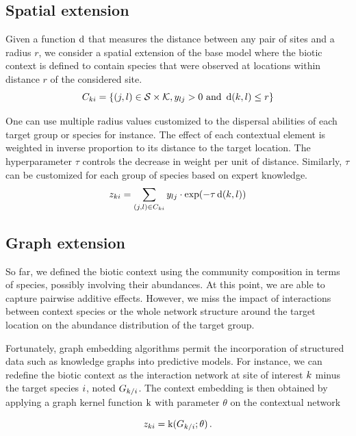 \documentclass[10pt,a4paper]{article}
\begin{document}
\subsection{Spatial extension}
Given a function $\operatorname{d}$ that measures the distance between any pair of sites and a radius $r$, we consider a spatial extension of the base model where the biotic context is defined to contain species that were observed at locations within distance $r$ of the considered site.
\begin{equation*}
  C_{ki} = \{(j, l) \in \mathcal{S} \times \mathcal{K}, y_{lj} > 0 \text{ and }  \operatorname{d}(k, l) \leq r\}
\end{equation*}

One can use multiple radius values customized to the dispersal abilities of each target group or species for instance. The effect of each contextual element is weighted in inverse proportion to its distance to the target location. The hyperparameter $\tau$ controls the decrease in weight per unit of distance. Similarly, $\tau$ can be customized for each group of species based on expert knowledge.  
\begin{equation*}
  z_{ki} = \sum_{(j, l) \in C_{ki}} y_{lj} \cdot \exp(-\tau \operatorname{d}(k, l))
\end{equation*}

\subsection{Graph extension}
So far, we defined the biotic context using the community composition in terms of species, possibly involving their abundances. At this point, we are able to capture pairwise additive effects. However, we miss the impact of interactions between context species or the whole network structure around the target location on the abundance distribution of the target group. 

Fortunately, graph embedding algorithms permit the incorporation of structured data such as knowledge graphs into predictive models. For instance, we can redefine the biotic context as the interaction network at site of interest $k$ minus the target species $i$, noted $G_{k/i}$. The context embedding is then obtained by applying a graph kernel function $\operatorname{k}$ with parameter $\theta$ on the contextual network

\begin{equation*}
  z_{ki} = \operatorname{k}(G_{k/i}; \theta)\,. 
\end{equation*}
\end{document}
